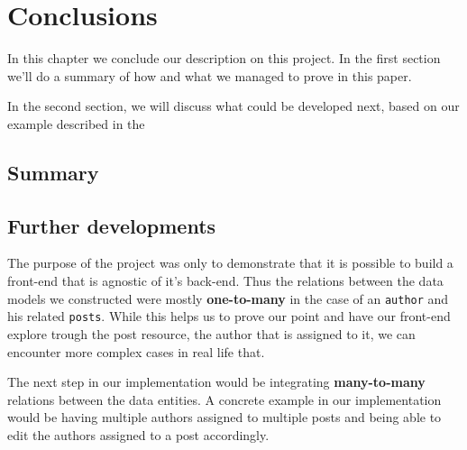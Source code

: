 \chapter{Conclusions}
\label{chapter:conclusions}

In this chapter we conclude our description on this project. In the first section  we'll do a summary of how and what we managed to prove in this paper.

In the second section,  we will discuss what could be developed next, based on our example described in the 

\section{Summary}
\label{sec:summary}


\section{Further developments}
\label{sec:further-developments}

The purpose of the project was only to demonstrate that it is possible to build a front-end that is agnostic of it's back-end. Thus the relations between the data models we constructed were mostly \textbf{one-to-many} in the case of an \texttt{author} and his related \texttt{posts}. While this helps us to prove our point and have our front-end explore trough the post resource, the author that is assigned to it, we can encounter more complex cases in real life that.

The next step in our implementation would be integrating \textbf{many-to-many} relations between the data entities. A concrete example in our implementation would be having multiple authors assigned to multiple posts and being able to edit the authors assigned to a post accordingly.